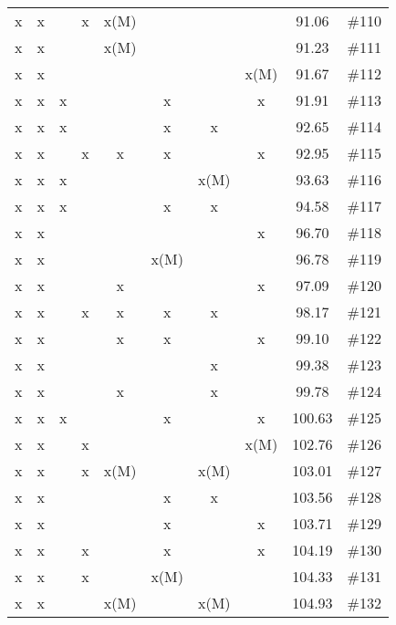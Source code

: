 \begin{longtable}{|c|c|c|c|c|c|c|c|c|c|}
 x    & x    &      & x    & x(M) &      &      &      & 91.06 & \#110 \\
 x    & x    &      &      & x(M) &      &      &      & 91.23 & \#111 \\
 x    & x    &      &      &      &      &      & x(M) & 91.67 & \#112 \\
 x    & x    & x    &      &      & x    &      & x    & 91.91 & \#113 \\
 x    & x    & x    &      &      & x    & x    &      & 92.65 & \#114 \\
 x    & x    &      & x    & x    & x    &      & x    & 92.95 & \#115 \\
 x    & x    & x    &      &      &      & x(M) &      & 93.63 & \#116 \\
 x    & x    & x    &      &      & x    & x    &      & 94.58 & \#117 \\
 x    & x    &      &      &      &      &      & x    & 96.70 & \#118 \\
 x    & x    &      &      &      & x(M) &      &      & 96.78 & \#119 \\
 x    & x    &      &      & x    &      &      & x    & 97.09 & \#120 \\
 x    & x    &      & x    & x    & x    & x    &      & 98.17 & \#121 \\
 x    & x    &      &      & x    & x    &      & x    & 99.10 & \#122 \\
 x    & x    &      &      &      &      & x    &      & 99.38 & \#123 \\
 x    & x    &      &      & x    &      & x    &      & 99.78 & \#124 \\
 x    & x    & x    &      &      & x    &      & x    & 100.63 & \#125 \\
 x    & x    &      & x    &      &      &      & x(M) & 102.76 & \#126 \\
 x    & x    &      & x    & x(M) &      & x(M) &      & 103.01 & \#127 \\
 x    & x    &      &      &      & x    & x    &      & 103.56 & \#128 \\
 x    & x    &      &      &      & x    &      & x    & 103.71 & \#129 \\
 x    & x    &      & x    &      & x    &      & x    & 104.19 & \#130 \\
 x    & x    &      & x    &      & x(M) &      &      & 104.33 & \#131 \\
 x    & x    &      &      & x(M) &      & x(M) &      & 104.93 & \#132 \\

\end{longtable}
